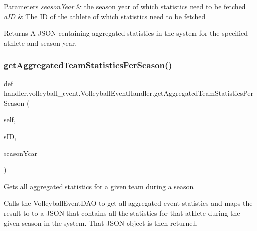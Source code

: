 \begin{DoxyParams}{Parameters}
{\em season\+Year} & the season year of which statistics need to be fetched \\
\hline
{\em a\+ID} & The ID of the athlete of which statistics need to be fetched\\
\hline
\end{DoxyParams}
\begin{DoxyReturn}{Returns}
A J\+S\+ON containing aggregated statistics in the system for the specified athlete and season year. 
\end{DoxyReturn}
\mbox{\label{classhandler_1_1volleyball__event_1_1_volleyball_event_handler_a9615712d5c8187f25803a4ecfc395ab5}} 
\subsubsection{\texorpdfstring{get\+Aggregated\+Team\+Statistics\+Per\+Season()}{getAggregatedTeamStatisticsPerSeason()}}
{\footnotesize\ttfamily def handler.\+volleyball\+\_\+event.\+Volleyball\+Event\+Handler.\+get\+Aggregated\+Team\+Statistics\+Per\+Season (\begin{DoxyParamCaption}\item[{}]{self,  }\item[{}]{s\+ID,  }\item[{}]{season\+Year }\end{DoxyParamCaption})}



Gets all aggregated statistics for a given team during a season. 

Calls the Volleyball\+Event\+D\+AO to get all aggregated event statistics and maps the result to to a J\+S\+ON that contains all the statistics for that athlete during the given season in the system. That J\+S\+ON object is then returned.


